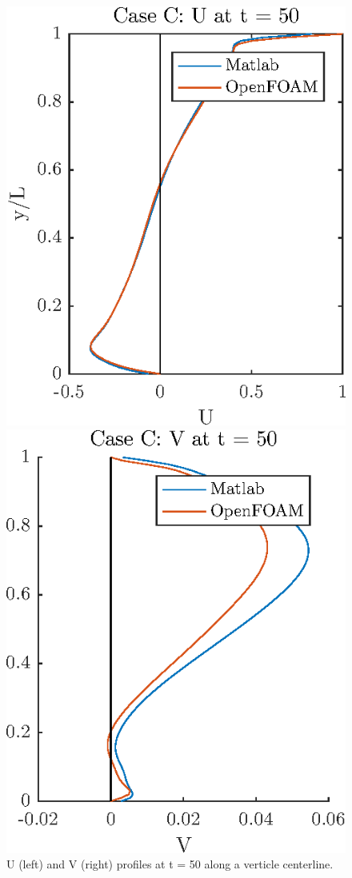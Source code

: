 \documentclass[10pt,a4paper]{article}
\begin{document}
\begin{figure}[H]
\centering
\begin{minipage}{.5\textwidth}
  \centering
  \includegraphics[width=.9\linewidth]{Ucenter.eps}
\end{minipage}%
\begin{minipage}{.5\textwidth}
  \centering
  \includegraphics[width=.9\linewidth]{Vcenter.eps}
\end{minipage}
\caption{U (left) and V (right) profiles at t = 50 along a verticle centerline.}
\label{fig:Q5}
\end{figure}
\end{document}
